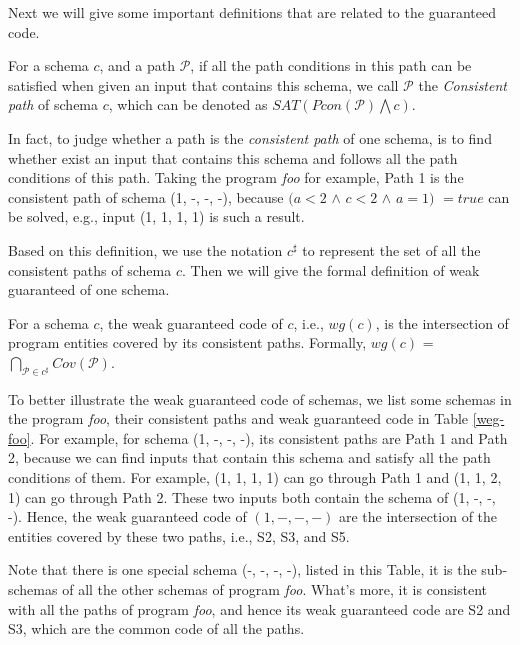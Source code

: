 \documentclass{sig-alternate-05-2015}
\begin{document}
Next we will give some important definitions that are related to the guaranteed code.

\begin{definition}
For a schema $c$, and a path $\mathcal{P}$, if all the path conditions in this path can be satisfied when given an input that contains this schema, we call $\mathcal{P}$ the \emph{Consistent path} of schema $c$, which can be denoted as $SAT(Pcon(\mathcal{P}) \bigwedge c)$.
\end{definition}

In fact, to judge whether a path is the \emph{consistent path} of one schema, is to find whether exist an input that contains this schema and follows all the path conditions of this path. Taking the program \emph{foo} for example, Path 1 is the consistent path of schema (1, -, -, -), because $( a < 2 $ $\wedge $ $c < 2 $ $\wedge $ $a = 1 )$  $= true $ can be solved, e.g., input (1, 1, 1, 1) is such a result.

Based on this definition, we use the notation $c^{\sharp}$ to represent the set of all the consistent paths of schema $c$. Then we will give the formal definition of weak guaranteed of one schema.

\begin{definition}
For a schema $c$, the weak guaranteed code of $c$, i.e., $wg(c)$, is the intersection of program entities covered by its consistent paths. Formally, $wg(c)$ = $\bigcap_{\mathcal{P} \in c^{\sharp}} Cov(\mathcal{P})$.

\end{definition}

To better illustrate the weak guaranteed code of schemas, we list some schemas in the program \emph{foo}, their consistent paths and weak guaranteed code in Table \ref{weg-foo}. For example, for schema (1, -, -, -), its consistent paths are Path 1 and Path 2, because we can find inputs that contain this schema and satisfy all the path conditions of them. For example, (1, 1, 1, 1) can go through Path 1 and (1, 1, 2, 1) can go through Path 2. These two inputs both contain the schema of (1, -, -, -). Hence, the weak guaranteed code of $(1, -, -, -)$ are the intersection of the entities covered by these two paths, i.e., S2, S3, and S5.

Note that there is one special schema (-, -, -, -), listed in this Table, it is the sub-schemas of all the other schemas of program \emph{foo}. What's more, it is consistent with all the paths of program \emph{foo}, and hence its weak guaranteed code are S2 and S3, which are the common code of all the paths.
\end{document}
